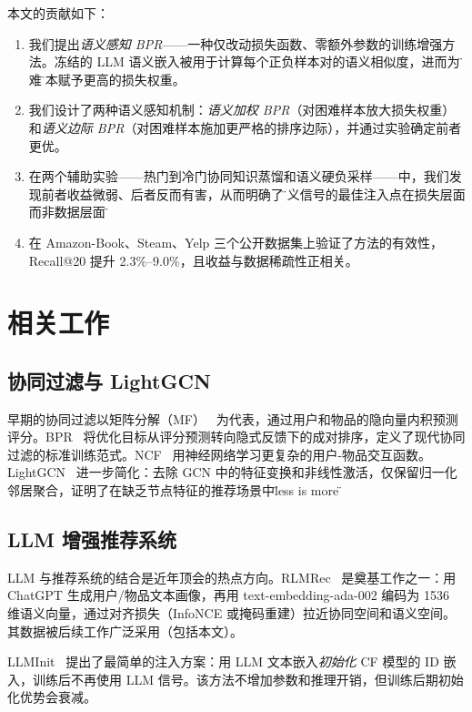 \documentclass[11pt,a4paper]{article}
\begin{document}
本文的贡献如下：
\begin{enumerate}
    \item 我们提出\emph{语义感知 BPR}——一种仅改动损失函数、零额外参数的训练增强方法。冻结的 LLM 语义嵌入被用于计算每个正负样本对的语义相似度，进而为\"困难\"样本赋予更高的损失权重。
    \item 我们设计了两种语义感知机制：\emph{语义加权 BPR}（对困难样本放大损失权重）和\emph{语义边际 BPR}（对困难样本施加更严格的排序边际），并通过实验确定前者更优。
    \item 在两个辅助实验——热门到冷门协同知识蒸馏和语义硬负采样——中，我们发现前者收益微弱、后者反而有害，从而明确了\"语义信号的最佳注入点在损失层面而非数据层面\"。
    \item 在 Amazon-Book、Steam、Yelp 三个公开数据集上验证了方法的有效性，Recall@20 提升 2.3\%--9.0\%，且收益与数据稀疏性正相关。
\end{enumerate}

\section{相关工作}

\subsection{协同过滤与 LightGCN}

早期的协同过滤以矩阵分解（MF）~\cite{Koren2009} 为代表，通过用户和物品的隐向量内积预测评分。BPR~\cite{Rendle2009} 将优化目标从评分预测转向隐式反馈下的成对排序，定义了现代协同过滤的标准训练范式。NCF~\cite{He2017NCF} 用神经网络学习更复杂的用户-物品交互函数。LightGCN~\cite{He2020LightGCN} 进一步简化：去除 GCN 中的特征变换和非线性激活，仅保留归一化邻居聚合，证明了在缺乏节点特征的推荐场景中\"less is more\"。

\subsection{LLM 增强推荐系统}

LLM 与推荐系统的结合是近年顶会的热点方向。RLMRec~\cite{Ren2024RLMRec} 是奠基工作之一：用 ChatGPT 生成用户/物品文本画像，再用 text-embedding-ada-002 编码为 1536 维语义向量，通过对齐损失（InfoNCE 或掩码重建）拉近协同空间和语义空间。其数据被后续工作广泛采用（包括本文）。

LLMInit~\cite{Zhang2025LLMInit} 提出了最简单的注入方案：用 LLM 文本嵌入\emph{初始化} CF 模型的 ID 嵌入，训练后不再使用 LLM 信号。该方法不增加参数和推理开销，但训练后期初始化优势会衰减。
\end{document}
